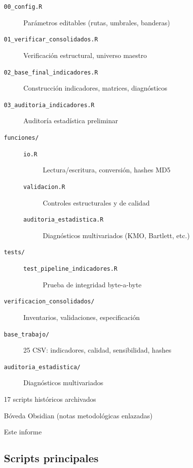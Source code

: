\begin{description}
    \begin{description}
        \item[\texttt{00\_config.R}] Parámetros editables (rutas, umbrales, banderas)
        \item[\texttt{01\_verificar\_consolidados.R}] Verificación estructural, universo maestro
        \item[\texttt{02\_base\_final\_indicadores.R}] Construcción indicadores, matrices, diagnósticos
        \item[\texttt{03\_auditoria\_indicadores.R}] Auditoría estadística preliminar
        \item[\texttt{funciones/}]
        \begin{description}
            \item[\texttt{io.R}] Lectura/escritura, conversión, hashes MD5
            \item[\texttt{validacion.R}] Controles estructurales y de calidad
            \item[\texttt{auditoria\_estadistica.R}] Diagnósticos multivariados (KMO, Bartlett, etc.)
        \end{description}
        \item[\texttt{tests/}]
        \begin{description}
            \item[\texttt{test\_pipeline\_indicadores.R}] Prueba de integridad byte-a-byte
        \end{description}
    \end{description}
    \item[\texttt{resultados/}]
    \begin{description}
        \item[\texttt{verificacion\_consolidados/}] Inventarios, validaciones, especificación
        \item[\texttt{base\_trabajo/}] 25 CSV: indicadores, calidad, sensibilidad, hashes
        \item[\texttt{auditoria\_estadistica/}] Diagnósticos multivariados
    \end{description}
    \item[\texttt{OLVIDADOS/}] 17 scripts históricos archivados
    \item[\texttt{.obsidian/}] Bóveda Obsidian (notas metodológicas enlazadas)
    \item[\texttt{main.tex}] Este informe
\end{description}

\subsection{Scripts principales}
\label{sec:scripts_principales}

